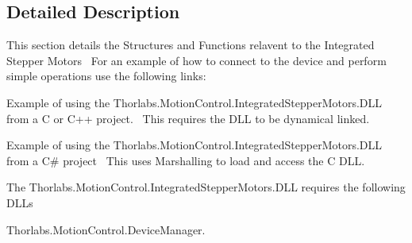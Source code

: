 

\subsection{Detailed Description}
This section details the Structures and Functions relavent to the Integrated Stepper Motors~\newline
 For an example of how to connect to the device and perform simple operations use the following links\+: 
\begin{DoxyItemize}
\item Example of using the Thorlabs.Motion\+Control.Integrated\+Stepper\+Motors.D\+LL from a C or C++ project.~\newline
 This requires the D\+LL to be dynamical linked.  
\item Example of using the Thorlabs.Motion\+Control.Integrated\+Stepper\+Motors.D\+LL from a C\# project~\newline
 This uses Marshalling to load and access the C D\+LL.  
\end{DoxyItemize}The Thorlabs.\+Motion\+Control.\+Integrated\+Stepper\+Motors.\+D\+LL requires the following D\+L\+Ls 
\begin{DoxyItemize}
\item Thorlabs.\+Motion\+Control.\+Device\+Manager.  
\end{DoxyItemize}

